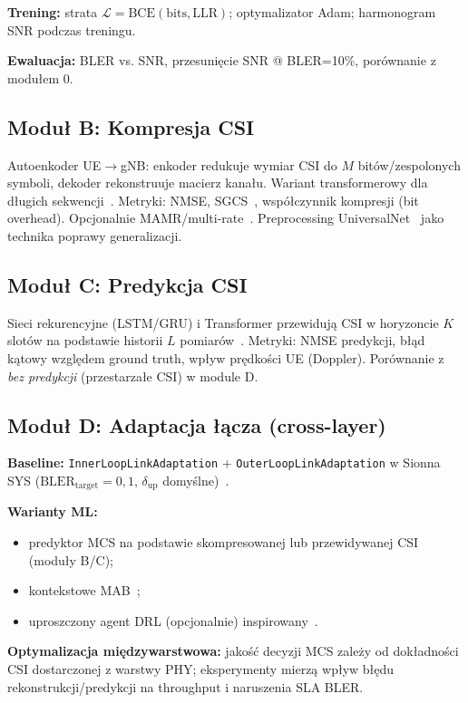 \documentclass[12pt, a4paper]{article}
\begin{document}
\textbf{Trening:} strata $\mathcal{L} = \mathrm{BCE}(\mathrm{bits}, \mathrm{LLR})$; optymalizator Adam; harmonogram SNR podczas treningu.

\textbf{Ewaluacja:} BLER vs. SNR, przesunięcie SNR @ BLER=10\%, porównanie z modułem 0.

\subsection{Moduł B: Kompresja CSI}

Autoenkoder UE$\rightarrow$gNB: enkoder redukuje wymiar CSI do $M$ bitów/zespolonych symboli, dekoder rekonstruuje macierz kanału. Wariant transformerowy dla długich sekwencji~\cite{mathworks-csi}. Metryki: NMSE, SGCS~\cite{3gpp-38843}, współczynnik kompresji (bit overhead). Opcjonalnie MAMR/multi-rate~\cite{ieee-9417115}. Preprocessing UniversalNet~\cite{arxiv-2409-13494} jako technika poprawy generalizacji.

\subsection{Moduł C: Predykcja CSI}

Sieci rekurencyjne (LSTM/GRU) i Transformer przewidują CSI w horyzoncie $K$ slotów na podstawie historii $L$ pomiarów~\cite{arxiv-2510-12996}. Metryki: NMSE predykcji, błąd kątowy względem ground truth, wpływ prędkości UE (Doppler). Porównanie z \emph{bez predykcji} (przestarzałe CSI) w module D.

\subsection{Moduł D: Adaptacja łącza (cross-layer)}

\textbf{Baseline:} \texttt{InnerLoopLinkAdaptation} + \texttt{OuterLoopLinkAdaptation} w Sionna SYS ($\mathrm{BLER}_{\mathrm{target}} = 0{,}1$, $\delta_{\mathrm{up}}$ domyślne)~\cite{sionna-sys}.

\textbf{Warianty ML:}
\begin{itemize}[leftmargin=*]
    \item predyktor MCS na podstawie skompresowanej lub przewidywanej CSI (moduły B/C);
    \item kontekstowe MAB~\cite{acm-mcs};
    \item uproszczony agent DRL (opcjonalnie) inspirowany~\cite{arxiv-2603-00689}.
\end{itemize}

\textbf{Optymalizacja międzywarstwowa:} jakość decyzji MCS zależy od dokładności CSI dostarczonej z warstwy PHY; eksperymenty mierzą wpływ błędu rekonstrukcji/predykcji na throughput i naruszenia SLA BLER.
\end{document}
